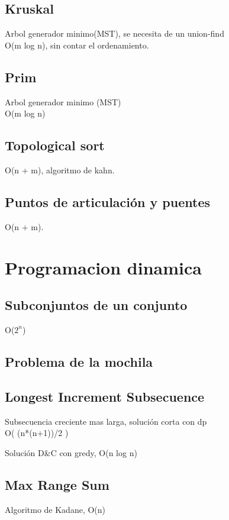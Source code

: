 \documentclass[10pt,landscape,twocolumn,a4paper,notitlepage]{article}
\newcommand\cppfile[2][]{

}
\begin{document}
			\subsection{Kruskal}
			Arbol generador minimo(MST), se necesita de un union-find\\
			O(m log n), sin contar el ordenamiento.
			\cppfile[44-67]{grafos/kruskal.cpp}
			\subsection{Prim}
			Arbol generador minimo (MST)\\
			O(m log n) 
			\cppfile[10-34]{grafos/prim.cpp}
			\subsection{Topological sort}
			O(n + m), algoritmo de kahn.
			\cppfile[7-30]{grafos/topological_sort_para_grafos_ciclicos.cpp}
			\subsection{Puntos de articulación y puentes}
			O(n + m).
			\cppfile[10-48]{grafos/puntos_de_articulacion_y_puentes.cpp}
			
		\section{Programacion dinamica}
			\subsection{Subconjuntos de un conjunto}
			O($2^{n}$)
			\cppfile[6-17]{programacion_dinamica/bitmask.cpp}
			\subsection{Problema de la mochila}
			\cppfile[8-23]{programacion_dinamica/knapsack.cpp}
			\subsection{Longest Increment Subsecuence}
			Subsecuencia creciente mas larga, solución corta con dp\\
			O( (n*(n+1))/2 )
			\cppfile[40-51]{programacion_dinamica/longest_increasing_subsequence.cpp}
			Solución D{\&}C con gredy, O(n log n)
			\cppfile[7-38]{programacion_dinamica/longest_increasing_subsequence.cpp}
			\subsection{Max Range Sum}
			Algoritmo de Kadane, O(n)
			\cppfile[6-22]{programacion_dinamica/Max_Range_Sum.cpp}
\end{document}
